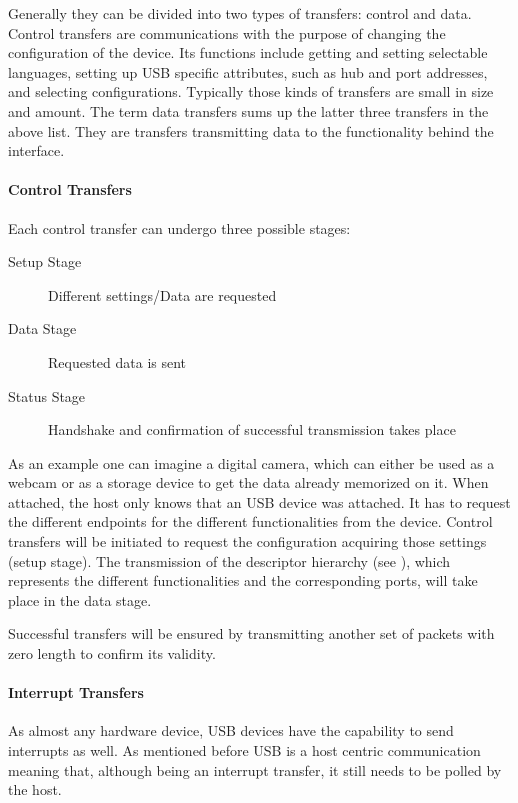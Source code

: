 Generally they can be divided into two types of transfers: control and data. Control transfers are communications with the purpose of changing the 
configuration of the device. Its functions include getting and setting selectable languages, setting up USB specific attributes, such as hub and port 
addresses, and selecting configurations. Typically those kinds of transfers are small in size and amount. 
The term data transfers sums up the latter three transfers in the above list. They are transfers transmitting data to the functionality 
behind the interface.%

\paragraph{Control Transfers}

Each control transfer can undergo three possible stages: 

\begin{description}
 \item[Setup Stage] Different settings/Data are requested
 \item[Data Stage] Requested data is sent
 \item[Status Stage] Handshake and confirmation of successful transmission takes place
\end{description}

As an example one can imagine a digital camera, which can either be used as a webcam or as a storage device to get the data already 
memorized on it. When attached, the host only knows that an USB device was attached. It has to request the different endpoints for the 
different functionalities from the device. Control transfers will be initiated to request the configuration acquiring those settings 
(setup stage). The transmission of the descriptor hierarchy (see ), which represents the different functionalities and the 
corresponding ports, will take place in the data stage.

Successful transfers will be ensured by transmitting another set of packets with zero length to confirm its validity.

\paragraph{Interrupt Transfers}

As almost any hardware device, USB devices have the capability to send interrupts as well. As mentioned before USB is a host centric communication 
meaning that, although being an interrupt transfer, it still needs to be polled by the host. 

